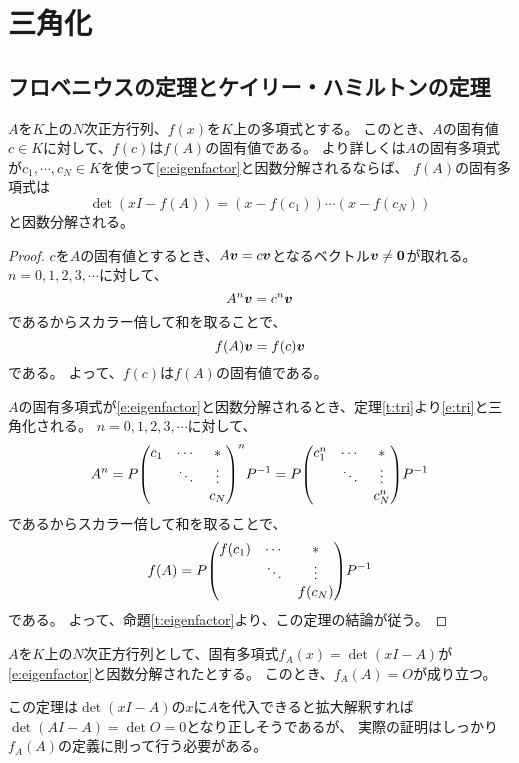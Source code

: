 
\chapter{三角化}

\section{フロベニウスの定理とケイリー・ハミルトンの定理}

\begin{theorem}[フロベニウスの定理]
$A$を$K$上の$N$次正方行列、$f(x)$を$K$上の多項式とする。
このとき、$A$の固有値$c \in K$に対して、$f(c)$は$f(A)$の固有値である。
より詳しくは$A$の固有多項式が$c_1, \cdots, c_N \in K$を使って\eqref{e:eigenfactor}と因数分解されるならば、
$f(A)$の固有多項式は
$$
\det(x I-f(A)) = (x-f(c_1))\cdots(x-f(c_N))
$$
と因数分解される。
\end{theorem}

\begin{proof}
$c$を$A$の固有値とするとき、$A\vb*{v} = c\vb*{v}$となるベクトル$\vb*{v} \ne \vb*{0}$が取れる。
$n = 0, 1, 2, 3, \cdots$に対して、
$$
A^n\vb*{v} = c^n\vb*{v}
$$
であるからスカラー倍して和を取ることで、
$$
f(A)\vb*{v} = f(c)\vb*{v}
$$
である。
よって、$f(c)$は$f(A)$の固有値である。

$A$の固有多項式が\eqref{e:eigenfactor}と因数分解されるとき、定理\ref{t:tri}より\eqref{e:tri}と三角化される。
$n = 0, 1, 2, 3, \cdots$に対して、
$$
A^n
= P\mqty(c_1 & \cdots & * \\ & \ddots & \vdots \\ & & c_N)^n P^{-1}
= P\mqty(c_1^n & \cdots & * \\ & \ddots & \vdots \\ & & c_N^n)P^{-1}
$$
であるからスカラー倍して和を取ることで、
$$
f(A) = P\mqty(f(c_1) & \cdots & * \\ & \ddots & \vdots \\ & & f(c_N))P^{-1}
$$
である。
よって、命題\ref{t:eigenfactor}より、この定理の結論が従う。
\end{proof}

\begin{theorem}
$A$を$K$上の$N$次正方行列として、固有多項式$f_A(x) = \det(x I-A)$が\eqref{e:eigenfactor}と因数分解されたとする。
このとき、$f_A(A) = O$が成り立つ。
\end{theorem}

\begin{remark}
この定理は$\det(x I-A)$の$x$に$A$を代入できると拡大解釈すれば$\det(A I-A) = \det O = 0$となり正しそうであるが、
実際の証明はしっかり$f_A(A)$の定義に則って行う必要がある。
\end{remark}


